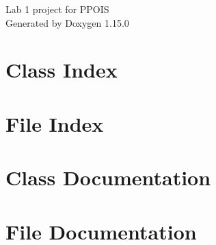 \documentclass[twoside]{book}
\newcommand{\+}{\discretionary{\mbox{\scriptsize$\hookleftarrow$}}{}{}}
\newcommand{\clearemptydoublepage}{%
    \newpage{\pagestyle{empty}\cleardoublepage}%
  }
\begin{document}
  \raggedbottom
    \hypersetup{pageanchor=false,
                bookmarksnumbered=true,
                pdfencoding=unicode
               }
  \begin{titlepage}
  \vspace*{7cm}
  \begin{center}%
  {\Large Lab 1 project for PPOIS}\\
  \vspace*{1cm}
  {\large Generated by Doxygen 1.15.0}\\
  \end{center}
  \end{titlepage}
  \clearemptydoublepage
  \tableofcontents
  \clearemptydoublepage
  \hypersetup{pageanchor=true}
\chapter{Class Index}

\chapter{File Index}

\chapter{Class Documentation}




\chapter{File Documentation}


  \backmatter
  \newpage
  \clearemptydoublepage
  \printindex
\end{document}
